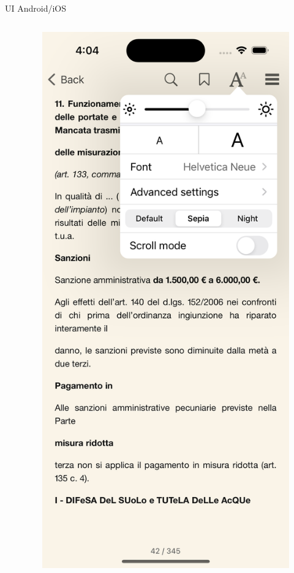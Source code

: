 \begin{frame}{UI Android/iOS}
\begin{columns}[onlytextwidth]
\begin{column}{0.14\textwidth}
        \end{column}
        \begin{column}{0.14\textwidth}
        
            \begin{figure}[H]
                \includegraphics[width=1\textwidth]{img/reader_settings_ios.png}
            \end{figure}
            
        \end{column}
    \end{columns}
\end{frame}
